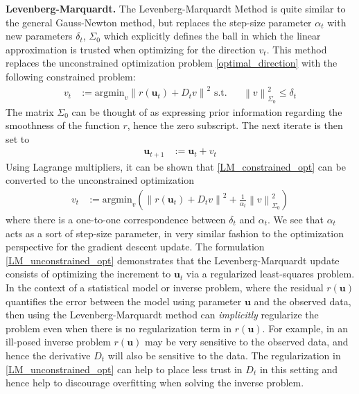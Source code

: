 \documentclass[12pt]{article}
\newcommand{\bpar}{\mathbf{u}} %
\newcommand*{\norm}[1]{\left\lVert#1\right\rVert}
\begin{document}
\bigskip
\noindent
\textbf{Levenberg-Marquardt.}
The Levenberg-Marquardt Method is quite similar to the general Gauss-Newton method, but replaces the step-size parameter $\alpha_t$ with new parameters $\delta_t$, $\Sigma_0$ which explicitly defines 
the ball in which the linear approximation is trusted when optimizing for the direction $v_t$. This method replaces the unconstrained optimization problem \ref{optimal_direction} with the following 
constrained problem:
\begin{align}
v_t &:= \text{argmin}_v \norm{r(\bpar_t) + D_t v}^2 \text{   s.t.} && \norm{v}^2_{\Sigma_0} \leq \delta_t \label{LM_constrained_opt}
\end{align}
The matrix $\Sigma_0$ can be thought of as expressing prior information regarding the smoothness of the function $r$, hence the zero subscript. The next iterate is then set to 
\begin{align*}
\bpar_{t+1} &:= \bpar_t + v_t
\end{align*}
Using Lagrange multipliers, it can be shown that \ref{LM_constrained_opt} can be converted to the unconstrained optimization 
\begin{align}
v_t &:= \text{argmin}_v\left( \norm{r(\bpar_t) + D_t v}^2 + \frac{1}{\alpha_t} \norm{v}^2_{\Sigma_0}\right) \label{LM_unconstrained_opt}
\end{align}
where there is a one-to-one correspondence between $\delta_t$ and $\alpha_t$. We see that $\alpha_t$ acts as a sort of step-size parameter, in very similar fashion to the optimization perspective 
for the gradient descent update. The formulation \ref{LM_unconstrained_opt} demonstrates that the Levenberg-Marquardt update consists of optimizing the increment to $\bpar_t$ via a regularized 
least-squares problem. In the context of a statistical model or inverse problem, where the residual $r(\bpar)$ quantifies the error between the model using parameter $\bpar$ and the observed data, then 
using the Levenberg-Marquardt method can \textit{implicitly} regularize the problem even when there is no regularization term in $r(\bpar)$. For example, in an ill-posed inverse problem $r(\bpar)$ may be very 
sensitive to the observed data, and hence the derivative $D_t$ will also be sensitive to the data. The regularization in \ref{LM_unconstrained_opt} can help to place less trust in $D_t$ in this setting and hence 
help to discourage overfitting when solving the inverse problem.  

\end{document}
